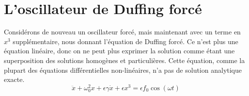 \chapter{L'oscillateur de Duffing forcé}
%
Considérons de nouveau un oscillateur forcé, mais maintenant avec un terme en $x^3$ supplémentaire, nous donnant l'équation de Duffing forcé. Ce n'est plus une équation linéaire, donc on ne peut plus exprimer la solution comme étant une superposition des solutions homogènes et particulières. Cette équation, comme la plupart des équations différentielles non-linéaires, n'a pas de solution analytique exacte.
%
%
\begin{equation}
    \ddot{x} + \omega_0^2 x + \epsilon \gamma \dot{x} + \epsilon x^3 = \epsilon f_0 \cos(\omega t)
    \label{eq:duffing}
\end{equation}
%

